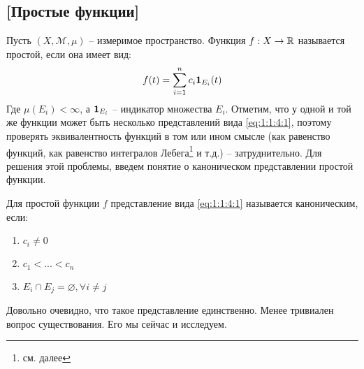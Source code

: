 \documentclass[../main.tex]{subfiles}
\begin{document}
\subsection{[Простые функции]}

Пусть $(X, \mathcal{M}, \mu)$ -- измеримое пространство. Функция $f : X \to \mathbb{R}$ называется простой, если она имеет вид:
\begin{equation}\label{eq:1:1:4:1}
	f(t) = \sum_{i=1}^{n}{c_i \mathbf{1}_{E_i} (t)}
\end{equation}
Где $\mu(E_i) < \infty$, а $\mathbf{1}_{E_i}$ -- индикатор множества $E_i$. Отметим, что у одной и той же функции может быть несколько представлений вида \eqref{eq:1:1:4:1}, поэтому проверять эквивалентность функций в том или ином смысле (как равенство функций, как равенство интегралов Лебега\footnote{см. далее} и т.д.) -- затруднительно. Для решения этой проблемы, введем понятие о каноническом представлении простой функции. 

\begin{definition}
	Для простой функции $f$ представление вида \eqref{eq:1:1:4:1} называется каноническим, если:
	\begin{enumerate}
		\item $c_i \neq 0$
		\item $c_1 < ... < c_n$
		\item $E_i \cap E_j = \varnothing, \forall i \neq j$
	\end{enumerate}
\end{definition}

Довольно очевидно, что такое представление единственно. Менее тривиален вопрос существования. Его мы сейчас и исследуем. 
\end{document}

